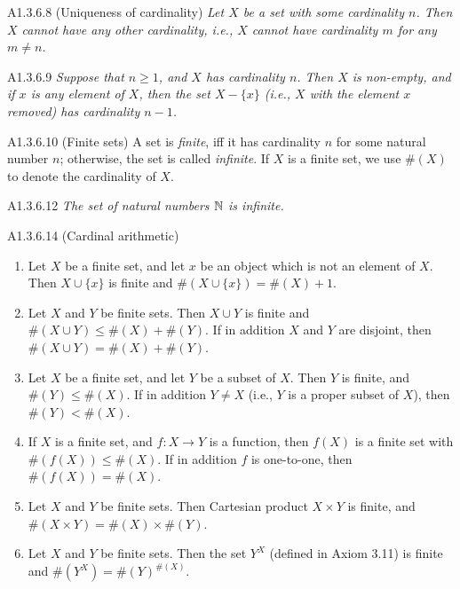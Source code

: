\begin{proposition}{A1.3.6.8}
    (Uniqueness of cardinality) \emph{Let $X$ be a set with some cardinality $n$. Then $X$ cannot have any other
    cardinality, i.e., $X$ cannot have cardinality $m$ for any $m\neq n$.}
\end{proposition}

\begin{lemma}{A1.3.6.9}
    \emph{Suppose that $n\geq 1$, and $X$ has cardinality $n$. Then $X$ is non-empty, and if $x$ is any element of $X$,
    then the set $X - \{x \}$ (i.e., $X$ with the element $x$ removed) has cardinality $n-1$.}
\end{lemma}

\begin{definition}{A1.3.6.10}
    (Finite sets) A set is \emph{finite}, iff it has cardinality $n$ for some natural number $n$; otherwise, the set is
    called \emph{infinite}. If $X$ is a finite set, we use $\#(X)$ to denote the cardinality of $X$.
\end{definition}

\begin{theorem}{A1.3.6.12}
    \emph{The set of natural numbers $\mathbb{N}$ is infinite.}
\end{theorem}

\begin{proposition}{A1.3.6.14}
    (Cardinal arithmetic)
    \begin{enumerate}
        \item Let $X$ be a finite set, and let $x$ be an object which is not an element of $X$. Then $X\cup \{x\}$ is
        finite and $\#(X\cup \{x\}) = \#(X) + 1$.
        \item Let $X$ and $Y$ be finite sets. Then $X\cup Y$ is finite and $\#(X\cup Y) \leq \#(X) + \#(Y)$. If in
        addition $X$ and $Y$ are disjoint, then $\#(X\cup Y) = \#(X) + \#(Y)$.
        \item Let $X$ be a finite set, and let $Y$ be a subset of $X$. Then $Y$ is finite, and $\#(Y)\leq \#(X)$. If
        in addition $Y\neq X$ (i.e., $Y$ is a proper subset of $X$), then $\#(Y) < \#(X)$.
        \item If $X$ is a finite set, and $f: X\rightarrow Y$ is a function, then $f(X)$ is a finite set with
        $\#(f(X))\leq \#(X)$. If in addition $f$ is one-to-one, then $\#(f(X)) = \#(X)$.
        \item Let $X$ and $Y$ be finite sets. Then Cartesian product $X\times Y$ is finite, and
        $\#(X\times Y) = \#(X)\times \#(Y)$.
        \item Let $X$ and $Y$ be finite sets. Then the set $Y^X$ (defined in Axiom 3.11) is finite and
        $\#(Y^X) = \#(Y)^{\#(X)}$.
    \end{enumerate}
\end{proposition}


